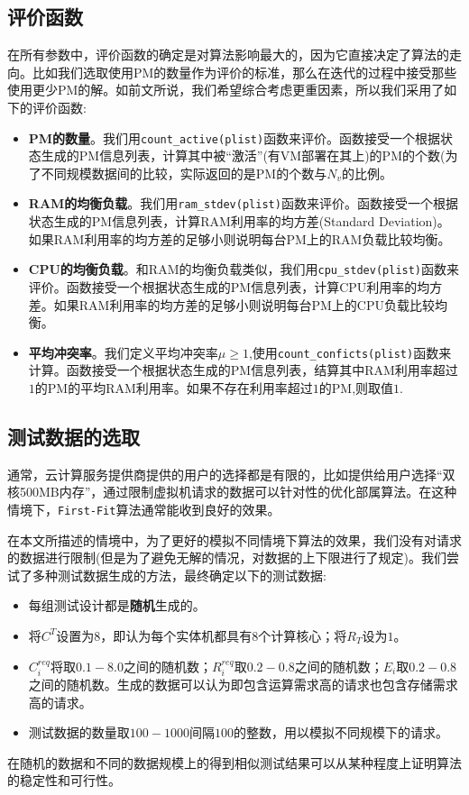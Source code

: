 \subsection{评价函数}
\label{sec:evaluation-function}

在所有参数中，评价函数的确定是对算法影响最大的，因为它直接决定了算法的走向。比如我们选取使用PM的数量作为评价的标准，那么在迭代的过程中接受那些使用更少PM的解。如前文所说，我们希望综合考虑更重因素，所以我们采用了如下的评价函数:

\begin{itemize}
\item \textbf{PM的数量}。我们用\texttt{count\_active(plist)}函数来评价。函数接受一个根据状态生成的PM信息列表，计算其中被``激活''(有VM部署在其上)的PM的个数(为了不同规模数据间的比较，实际返回的是PM的个数与$N_v$的比例。
\item \textbf{RAM的均衡负载}。我们用\texttt{ram\_stdev(plist)}函数来评价。函数接受一个根据状态生成的PM信息列表，计算RAM利用率的均方差(Standard Deviation)。如果RAM利用率的均方差的足够小则说明每台PM上的RAM负载比较均衡。
\item \textbf{CPU的均衡负载}。和RAM的均衡负载类似，我们用\texttt{cpu\_stdev(plist)}函数来评价。函数接受一个根据状态生成的PM信息列表，计算CPU利用率的均方差。如果RAM利用率的均方差的足够小则说明每台PM上的CPU负载比较均衡。
\item \textbf{平均冲突率}。我们定义平均冲突率$\mu \geq 1$,使用\texttt{count\_conficts(plist)}函数来计算。函数接受一个根据状态生成的PM信息列表，结算其中RAM利用率超过$1$的PM的平均RAM利用率。如果不存在利用率超过$1$的PM,则取值$1$.
\end{itemize}

\subsection{测试数据的选取}
\label{sec:data}
通常，云计算服务提供商提供的用户的选择都是有限的，比如提供给用户选择``双核500MB内存''，通过限制虚拟机请求的数据可以针对性的优化部属算法。在这种情境下，\texttt{First-Fit}算法通常能收到良好的效果。

在本文所描述的情境中，为了更好的模拟不同情境下算法的效果，我们没有对请求的数据进行限制(但是为了避免无解的情况，对数据的上下限进行了规定)。我们尝试了多种测试数据生成的方法，最终确定以下的测试数据:
\begin{itemize}
\item 每组测试设计都是\textbf{随机}生成的。
\item 将$C^T$设置为$8$，即认为每个实体机都具有$8$个计算核心；将$R_T$设为$1$。
\item $C^{req}_i$将取$0.1-8.0$之间的随机数；$R^{req}_i$取$0.2-0.8$之间的随机数；$E_i$取$0.2-0.8$之间的随机数。生成的数据可以认为即包含运算需求高的请求也包含存储需求高的请求。
\item 测试数据的数量取$100-1000$间隔$100$的整数，用以模拟不同规模下的请求。
\end{itemize}

在随机的数据和不同的数据规模上的得到相似测试结果可以从某种程度上证明算法的稳定性和可行性。
